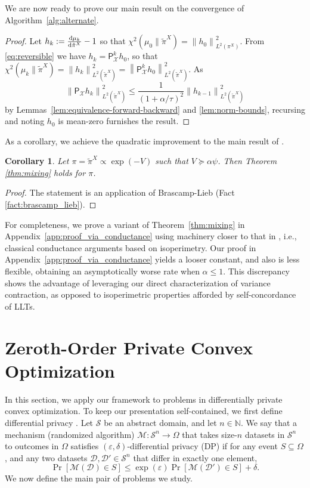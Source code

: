 \documentclass[11pt]{article}
\newtheorem{corollary}{Corollary}
\newcommand{\defeq}{:=}
\newcommand{\norm}[1]{\left\lVert#1\right\rVert}
\newcommand{\eps}{\epsilon}
\newcommand{\N}{\mathbb{N}}
\newcommand{\dd}{\textup{d}}
\newcommand{\Brack}[1]{\left[#1\right]}
\newcommand{\0}{\mathbf{0}}
\newcommand{\1}{\mathbf{1}}
\newcommand{\calD}{\mathcal{D}}
\newcommand{\calM}{\mathcal{M}}
\newcommand{\calS}{\mathcal{S}}
\newcommand{\calX}{\mathcal{X}}
\newcommand{\sfP}{\mathsf{P}}
\newcommand{\tpi}{\tilde{\pi}}
\renewcommand{\epsilon}{\varepsilon}
\begin{document}
We are now ready to prove our main result on the convergence of Algorithm~\ref{alg:alternate}.

\restatemixing*
\begin{proof}
    Let $h_k \defeq \frac{\dd\mu_k}{\dd\tpi^X}-1$ so that $\chi^2(\mu_0\| \tpi^X)=\norm{h_0}^2_{L^2(\pi^X)}$.  From \eqref{eq:reversible} we have $h_k=\sfP_{\calX}^k h_0$, so that $\chi^2(\mu_k\|\tpi^X) =\norm{h_k}^2_{L^2(\tpi^X)}= \norm{\sfP_\calX^kh_0}_{L^2(\tpi^X)}^2$.  As 
    \[\norm{\sfP_\calX h_k}^2_{L^2(\tpi^X)}\leq \frac{1}{(1+\alpha/\tau)^2}\norm{h_{k-1}}_{L^2(\tpi^X)}^2\]
    by Lemmas~\ref{lem:equivalence-forward-backward} and \ref{lem:norm-bounds}, recursing and noting $h_0$ is mean-zero furnishes the result.
\end{proof}

As a corollary, we achieve the quadratic improvement to the main result of \cite{GopiLLST25}.
\begin{corollary}\label{cor:slc_mixing}
    Let $\pi = \tpi^X\propto \exp(-V)$ such that $V\succeq \alpha\psi$.  Then Theorem \ref{thm:mixing} holds for $\pi$.
\end{corollary}
\begin{proof}
    The statement is an application of Brascamp-Lieb (Fact \ref{fact:brascamp_lieb}).
\end{proof}

For completeness, we prove a variant of Theorem~\ref{thm:mixing} in Appendix~\ref{app:proof_via_conductance} using machinery closer to that in \cite{GopiLLST25}, i.e., classical conductance arguments based on isoperimetry. Our proof in Appendix~\ref{app:proof_via_conductance} yields a looser constant, and also is less flexible, obtaining an asymptotically worse rate when $\alpha \le 1$. This discrepancy shows the advantage of leveraging our direct characterization of variance contraction, as opposed to isoperimetric properties afforded by self-concordance of LLTs.


% 
\section{Zeroth-Order Private Convex Optimization}\label{ssec:dp}

In this section, we apply our framework to problems in differentially private convex optimization. To keep our presentation self-contained, we first define differential privacy \cite{DworkMNS06,DworkR14}. Let $\calS$ be an abstract domain, and let $n \in \N$. We say that a mechanism (randomized algorithm) $\calM: \calS^n \to \Omega$ that takes size-$n$ datasets in $\calS^n$ to outcomes in $\Omega$ satisfies $(\eps, \delta)$-differential privacy (DP) if for any event $S \subseteq \Omega$, and any two datasets $\calD, \calD' \in \calS^n$ that differ in exactly one element,
\[\Pr\Brack{\calM(\calD) \in S} \le \exp(\eps)\Pr\Brack{\calM(\calD') \in S} + \delta.\]
We now define the main pair of problems we study.
\end{document}
